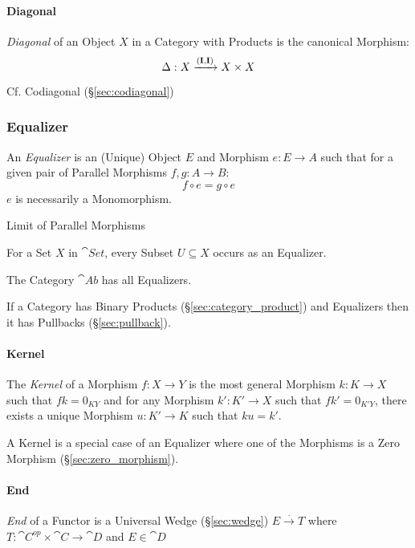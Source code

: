 \paragraph{Diagonal}\label{sec:diagonal}\hfill

\emph{Diagonal} of an Object $X$ in a Category with Products is the
canonical Morphism:
\[
  \Delta : X \xrightarrow{(\mathbf{I},\mathbf{I})} X \times X
\]

\fist Cf. Codiagonal (\S\ref{sec:codiagonal})



\subsubsection{Equalizer}\label{sec:equalizer}

An \emph{Equalizer} is an (Unique) Object $E$ and Morphism $e: E
\rightarrow A$ such that for a given pair of Parallel Morphisms $f,g :
A \rightarrow B$:
\[
  f \circ e = g \circ e
\]
$e$ is necessarily a Monomorphism.

Limit of Parallel Morphisms

For a Set $X$ in $\cat{Set}$, every Subset $U \subseteq X$ occurs
as an Equalizer.

The Category $\cat{Ab}$ has all Equalizers.

If a Category has Binary Products (\S\ref{sec:category_product}) and
Equalizers then it has Pullbacks (\S\ref{sec:pullback}).



\paragraph{Kernel}\label{sec:morphism_kernel}\hfill

The \emph{Kernel} of a Morphism $f : X \rightarrow Y$ is the most
general Morphism $k : K \rightarrow X$ such that $fk = 0_{KY}$ and for
any Morphism $k' : K' \rightarrow X$ such that $fk' = 0_{K'Y}$, there
exists a unique Morphism $u : K' \rightarrow K$ such that $ku = k'$.

A Kernel is a special case of an Equalizer where one of the Morphisms
is a Zero Morphism (\S\ref{sec:zero_morphism}).



\paragraph{End}\label{sec:end}\hfill

\emph{End} of a Functor is a Universal Wedge (\S\ref{sec:wedge}) $E
\xrightarrow{.} T$ where $T : \cat{C}^{op} \times \cat{C}
\rightarrow \cat{D}$ and $E \in \cat{D}$

